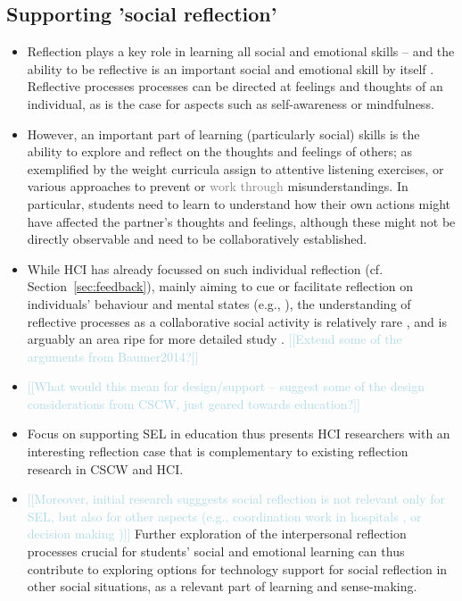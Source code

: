 \documentclass[prodmode,acmtochi]{acmsmall}
\newcommand{\todo}[1]{\textrm{\textrm{\textcolor{LightBlue}{[[#1]]} } } }
\newcommand{\rephrase}[1]{\textrm{\textrm{\textcolor{gray}{#1}}}}
\begin{document}
\subsection{Supporting 'social reflection'}

\begin{itemize}
	\item 
Reflection plays a key role in learning all social and emotional skills -- and the ability to be reflective is an important social and emotional skill by itself \cite{Cohen2001,r,r}. Reflective processes processes can be directed at feelings and thoughts of an individual, as is the case for aspects such as self-awareness or mindfulness. 
		
		
\item However, an important part of learning (particularly social) skills is the ability to explore and reflect on the thoughts and feelings of others; as exemplified by the weight curricula assign to attentive listening exercises, or various approaches to prevent or \rephrase{work through} misunderstandings.
%
In particular, students need to learn to understand how their own actions might have affected the partner’s thoughts and feelings, although these might not be directly observable and need to be collaboratively established.


\item While HCI has already focussed on such individual reflection (cf. Section~\ref{sec:feedback}), mainly aiming to cue or facilitate reflection on individuals' behaviour and mental states (e.g., \cite{Sas2011,Stahl2008,Thieme2011,Isaacs2013}), the understanding of reflective processes as a collaborative social activity is relatively rare \cite{Fleck2012,Prilla2012}, and is arguably an area ripe for more detailed study \cite{Baumer2014}. 
\todo{Extend some of the arguments from Baumer2014?}

\item \todo{What would this mean for design/support -- suggest some of the design considerations from CSCW, just geared towards education?}

\item Focus on supporting SEL in education thus presents HCI researchers with an interesting reflection case that is complementary to  existing reflection research in CSCW and HCI.  

\item \todo{Moreover, initial research sugggests social reflection is not relevant only for SEL, but also for other aspects (e.g., coordination work in hospitals \cite{Prilla}, or decision making \cite{Dey})} Further exploration of the interpersonal reflection processes crucial for students' social and emotional learning can thus contribute to exploring options for technology support for social reflection in other social situations, as a relevant part of learning and sense-making.




\end{itemize}
\end{document}
